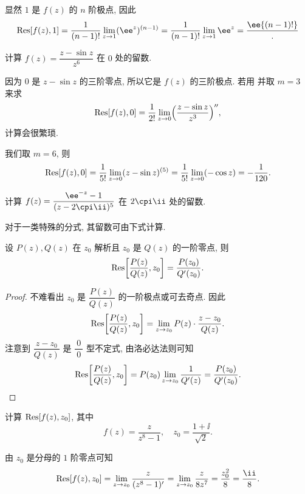 \begin{solution}
  显然 $1$ 是 $f(z)$ 的 $n$ 阶极点, 因此
  \[
     \Res[f(z),1]
    =\frac1{(n-1)!}\lim_{z\ra 1}(\ee^z)^{(n-1)}
    =\frac1{(n-1)!}\lim_{z\ra 1}\ee^z
    =\frac\ee{(n-1)!}.
  \]
\end{solution}

\begin{example}
  计算 $f(z)=\dfrac{z-\sin z}{z^6}$ 在 $0$ 处的留数.
\end{example}

\begin{solution}
  因为 $0$ 是 $z-\sin z$ 的三阶零点, 所以它是 $f(z)$ 的三阶极点.
  若用 并取 $m=3$ 来求
  \[
     {\mathrm{Res}}[f(z),0]
    =\frac1{2!}\lim_{z\rightarrow0}\Bigl(\frac{z-\sin z}{z^3}\Bigr)'',
  \]
  计算会很繁琐.
  
  我们取 $m=6$, 则
  \[
     {\mathrm{Res}}[f(z),0]
    =\frac1{5!}\lim_{z\rightarrow 0}(z-\sin z)^{(5)}
    =\frac1{5!}\lim_{z\rightarrow 0}(-\cos z)
    =-\frac1{120}.
  \]
\end{solution}

\begin{exercise}
  计算 $f(z)=\dfrac{\ee^{-z}-1}{(z-2\cpi\ii)^5}$ 在 $2\cpi\ii$ 处的留数.
\end{exercise}

对于一类特殊的分式, 其留数可由下式计算.

\begin{theorem}
  设 $P(z),Q(z)$ 在 $z_0$ 解析且 $z_0$ 是 $Q(z)$ 的一阶零点, 则
  \[
     {\mathrm{Res}}\biggl[\frac{P(z)}{Q(z)},z_0\biggr]
    =\frac{P(z_0)}{Q'(z_0)}.
  \]
\end{theorem}

\begin{proof}
  不难看出 $z_0$ 是 $\dfrac{P(z)}{Q(z)}$ 的一阶极点或可去奇点. 因此
  \[
    {\mathrm{Res}}\biggl[\frac{P(z)}{Q(z)},z_0\biggr]
    =\lim_{z\rightarrow z_0}P(z)\cdot \frac{z-z_0}{Q(z)}.
  \]
  注意到 $\dfrac{z-z_0}{Q(z)}$ 是 $\dfrac{~0~}0$ 型不定式, 由洛必达法则可知
  \[
     {\mathrm{Res}}\biggl[\frac{P(z)}{Q(z)},z_0\biggr]
    =P(z_0)\lim_{z\rightarrow z_0}\frac1{Q'(z)}
    =\frac{P(z_0)}{Q'(z_0)}.\qedhere
  \]
\end{proof}

\begin{example}
  计算 ${\mathrm{Res}}[f(z),z_0]$, 其中
  \[
    f(z)=\frac{z}{z^8-1},\quad z_0=\frac{1+\ii}{\sqrt2}.
  \]
\end{example}

\begin{solution}
  由 $z_0$ 是分母的 $1$ 阶零点可知
  \[
     \Res[f(z),z_0]
    =\lim_{z\ra z_0}\frac z{(z^8-1)'}
    =\lim_{z\ra z_0}\frac z{8z^7}
    =\frac{z_0^2}8
    =\frac\ii8.
  \]
\end{solution}


